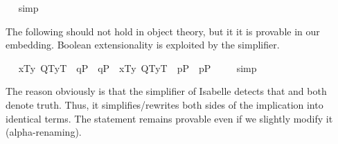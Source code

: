 \begin{isabellebody}
\isadelimproof
\ %
\endisadelimproof
%
\isatagproof
{}\isamarkupfalse%
\ simp\ \isamarkupfalse%
%
\endisatagproof
{\isafoldproof}%
%
\isadelimproof
%
\endisadelimproof
%
\isamarkuptrue%
%
\begin{isamarkuptext}%
The following should not hold in object theory, but it 
 it is provable in our embedding. Boolean extensionality is exploited by the simplifier.%
\end{isamarkuptext}\isamarkuptrue%
\ \isamarkupfalse%
\ {\isachardoublequoteopen}{\isacharbrackleft}{\isasymlbrace}x\isactrlsup T{\isacharcomma}{\isacharparenleft}\isactrlbold {\isasymlambda}y{\isachardot}\ {\isacharparenleft}{\isasymlparr}Q\isactrlsup T{\isacharcomma}y\isactrlsup T{\isasymrparr}\ \isactrlbold {\isasymand}\ {\isacharparenleft}q\isactrlsup P\ \isactrlbold {\isasymor}\ \isactrlbold {\isasymnot}q\isactrlsup P{\isacharparenright}{\isacharparenright}{\isacharparenright}{\isasymrbrace}\ \isactrlbold {\isasymrightarrow}\ {\isasymlbrace}x\isactrlsup T{\isacharcomma}{\isacharparenleft}\isactrlbold {\isasymlambda}y{\isachardot}\ {\isacharparenleft}{\isasymlparr}Q\isactrlsup T{\isacharcomma}y\isactrlsup T{\isasymrparr}\ \isactrlbold {\isasymand}\ {\isacharparenleft}p\isactrlsup P\ \isactrlbold {\isasymor}\ \isactrlbold {\isasymnot}p\isactrlsup P{\isacharparenright}{\isacharparenright}{\isacharparenright}{\isasymrbrace}{\isacharbrackright}\ {\isacharequal}\ {\isasymtop}{\isachardoublequoteclose}%
\isadelimproof
\ %
\endisadelimproof
%
\isatagproof
{}\isamarkupfalse%
\ simp\ \isamarkupfalse%
%
\endisatagproof
{\isafoldproof}%
%
\isadelimproof
%
\endisadelimproof
%
\begin{isamarkuptext}%
The reason obviously is that the simplifier of Isabelle detects that 
  and  both denote truth. 
 Thus, it simplifies/rewrites both sides of the implication into identical terms. 
 The statement remains provable even if we slightly modify it (alpha-renaming).%
\end{isamarkuptext}\isamarkuptrue%
\ \isamarkupfalse%

\end{isabellebody}
